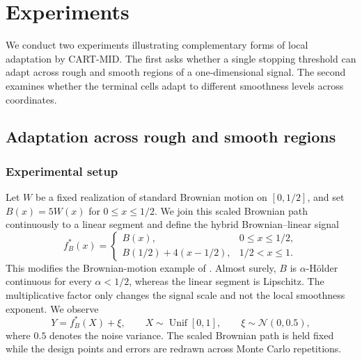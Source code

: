 \documentclass[11pt]{article}
\theoremstyle{plain}
\theoremstyle{definition}
\theoremstyle{remark}
\newtheorem{remark}[theorem]{Remark}
\theoremstyle{plain}
\newcommand{\1}{\mathbbm{1}}
\begin{document}

\section{Experiments}

We conduct two experiments illustrating complementary forms of
local adaptation by CART-MID.  The first asks whether a single
stopping threshold can adapt across rough and smooth regions of
a one-dimensional signal.  The second examines whether the
terminal cells adapt to different smoothness levels across
coordinates.

\subsection{Adaptation across rough and smooth regions}

\subsubsection*{Experimental setup}

Let $W$ be a fixed realization of standard Brownian motion on
$[0,1/2]$, and set $B(x)=5W(x)$ for $0\leq x\leq 1/2$.
We join this scaled Brownian path continuously to a linear
segment and define the hybrid Brownian--linear signal
\[
f_B^*(x)=
\begin{cases}
    B(x), & 0\leq x\leq 1/2,\\
    B(1/2)+4(x-1/2), & 1/2<x\leq 1.
\end{cases}
\]
This modifies the Brownian-motion example of
\citet{rovckova2024ideal}.  Almost surely, $B$ is
$\alpha$-H\"older continuous for every $\alpha<1/2$, whereas
the linear segment is Lipschitz.  The multiplicative factor only
changes the signal scale and not the local smoothness exponent.
We observe
\[
Y=f_B^*(X)+\xi,
\qquad
X\sim\operatorname{Unif}[0,1],
\qquad
\xi\sim\mathcal N(0,0.5),
\]
where $0.5$ denotes the noise variance.  The scaled Brownian path
is held fixed while the design points and errors are redrawn
across Monte Carlo repetitions.
\end{document}
